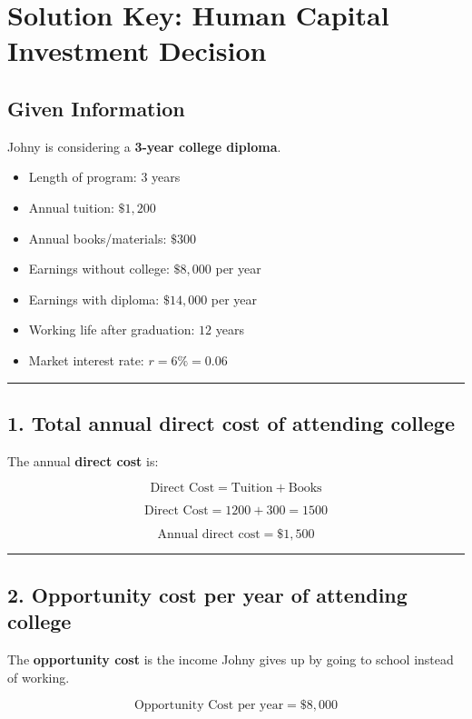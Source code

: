 \documentclass[12pt]{article}
\begin{document}
\section*{Solution Key: Human Capital Investment Decision}

\subsection*{Given Information}

Johny is considering a \textbf{3-year college diploma}.

\begin{itemize}
    \item Length of program: \(3\) years
    \item Annual tuition: \(\$1{,}200\)
    \item Annual books/materials: \(\$300\)
    \item Earnings without college: \(\$8{,}000\) per year
    \item Earnings with diploma: \(\$14{,}000\) per year
    \item Working life after graduation: \(12\) years
    \item Market interest rate: \(r = 6\% = 0.06\)
\end{itemize}

\hrule
\vspace{0.5em}

\subsection*{1. Total annual direct cost of attending college}

The annual \textbf{direct cost} is:

\[
\text{Direct Cost} = \text{Tuition} + \text{Books}
\]

\[
\text{Direct Cost} = 1200 + 300 = 1500
\]

\[
\boxed{\text{Annual direct cost} = \$1{,}500}
\]

\hrule
\vspace{0.5em}

\subsection*{2. Opportunity cost per year of attending college}

The \textbf{opportunity cost} is the income Johny gives up by going to school instead of working.

\[
\text{Opportunity Cost per year} = \$8{,}000
\]
\end{document}
